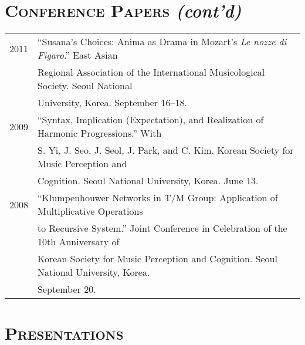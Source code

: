 \documentclass[a4paper,11pt,draft]{article}
\begin{document}
  \section*{\textsc{Conference Papers} \textit{(cont'd)}}
  
  \hspace*{-0.25cm}
  \begin{tabular}{p{2.5cm} p{12.5cm}}
  2011 & “Susana’s Choices: Anima as Drama in Mozart’s \textit{Le nozze di Figaro}.” East Asian\\
  & Regional Association of the International Musicological Society. Seoul National\\
  & University, Korea. September 16–18.\\[2mm]

  2009 & “Syntax, Implication (Expectation), and Realization of Harmonic Progressions.” With\\
  & S. Yi, J. Seo, J. Seol, J. Park, and C. Kim. Korean Society for Music Perception and\\
  & Cognition. Seoul National University, Korea. June 13.\\[2mm]

  2008 & “Klumpenhouwer Networks in T/M Group: Application of Multiplicative Operations\\
  & to Recursive System.” Joint Conference in Celebration of the 10th Anniversary of\\
  & Korean Society for Music Perception and Cognition. Seoul National University, Korea.\\
  & September 20.
  \end{tabular}
  
  \vspace{2.5mm}
  
  \section*{\textsc{Presentations}}
  
\end{document}
